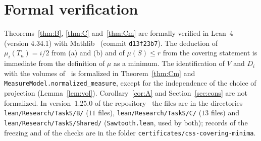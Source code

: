 \documentclass[11pt]{article}
\theoremstyle{definition}
\theoremstyle{remark}
\newcommand{\repoversion}{1.25.0}
\begin{document}
{\sloppy
\section{Formal verification}\label{sec:lean}

Theorems~\ref{thm:B}, \ref{thm:C} and~\ref{thm:Cm} are formally verified in
Lean~4 (version 4.34.1) with Mathlib~\cite{mathlib} (commit
\texttt{d13f23b7}). The deduction of $\mu_i(T_n)=i/2$ from (a) and (b) and of
$\mu(S)\le r$ from the covering statement is immediate from the definition of
$\mu$ as a minimum. The identification of $V$ and $D_i$ with the volumes
of~\cite{css} is formalized in Theorem~\ref{thm:Cm} and
\texttt{MeasureModel.normalized\_\allowbreak measure}, except for the
independence of the choice of projection (Lemma~\ref{lem:vol}).
Corollary~\ref{cor:A} and Section~\ref{sec:cons} are not formalized. In
version~\repoversion{} of the repository~\cite{repo} the files are in the
directories \texttt{lean/Research/TaskS/B/} ($11$ files),
\texttt{lean/Research/TaskS/C/} ($13$ files) and
\texttt{lean/Research/TaskS/Shared/} (\texttt{Sawtooth.lean}, used by both);
records of the freezing and of the checks are in the folder
\texttt{certificates/css-covering-minima}.

}
\end{document}
